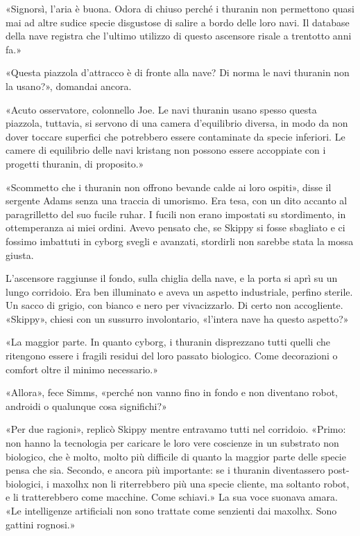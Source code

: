 «Signorsì, l'aria è buona. Odora di chiuso perché i thuranin non
permettono quasi mai ad altre sudice specie disgustose di salire a bordo
delle loro navi. Il database della nave registra che l'ultimo utilizzo
di questo ascensore risale a trentotto anni fa.»

«Questa piazzola d'attracco è di fronte alla nave? Di norma le navi
thuranin non la usano?», domandai ancora.

«Acuto osservatore, colonnello Joe. Le navi thuranin usano spesso questa
piazzola, tuttavia, si servono di una camera d'equilibrio diversa, in
modo da non dover toccare superfici che potrebbero essere contaminate da
specie inferiori. Le camere di equilibrio delle navi kristang non
possono essere accoppiate con i progetti thuranin, di proposito.»

«Scommetto che i thuranin non offrono bevande calde ai loro ospiti»,
disse il sergente Adams senza una traccia di umorismo. Era tesa, con un
dito accanto al paragrilletto del suo fucile ruhar. I fucili non erano
impostati su stordimento, in ottemperanza ai miei ordini. Avevo pensato
che, se Skippy si fosse sbagliato e ci fossimo imbattuti in cyborg
svegli e avanzati, stordirli non sarebbe stata la mossa giusta.

L'ascensore raggiunse il fondo, sulla chiglia della nave, e la porta si
aprì su un lungo corridoio. Era ben illuminato e aveva un aspetto
industriale, perfino sterile. Un sacco di grigio, con bianco e nero per
vivacizzarlo. Di certo non accogliente. «Skippy», chiesi con un sussurro
involontario, «l'intera nave ha questo aspetto?»

«La maggior parte. In quanto cyborg, i thuranin disprezzano tutti quelli
che ritengono essere i fragili residui del loro passato biologico. Come
decorazioni o comfort oltre il minimo necessario.»

«Allora», fece Simms, «perché non vanno fino in fondo e non diventano
robot, androidi o qualunque cosa significhi?»

«Per due ragioni», replicò Skippy mentre entravamo tutti nel corridoio.
«Primo: non hanno la tecnologia per caricare le loro vere coscienze in
un substrato non biologico, che è molto, molto più difficile di quanto
la maggior parte delle specie pensa che sia. Secondo, e ancora più
importante: se i thuranin diventassero post-biologici, i maxolhx non li
riterrebbero più una specie cliente, ma soltanto robot, e li
tratterebbero come macchine. Come schiavi.» La sua voce suonava amara.
«Le intelligenze artificiali non sono trattate come senzienti dai
maxolhx. Sono gattini rognosi.»

